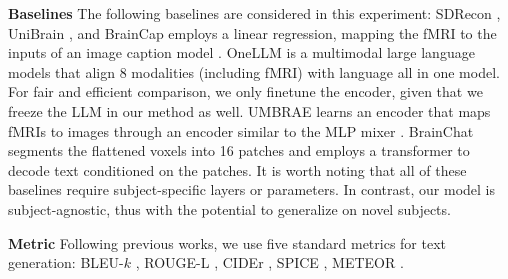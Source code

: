 \noindent\textbf{Baselines}
The following baselines are considered in this experiment: SDRecon \citep{takagi2023high}, UniBrain \citep{mai2023unibrain}, and BrainCap \citep{ferrante2023brain} employs a linear regression, mapping the fMRI to the inputs of an image caption model \citep{li2023blip}. OneLLM \citep{han2024onellm} is a multimodal large language models that align $8$ modalities (including fMRI) with language all in one model. For fair and efficient comparison, we only finetune the encoder, given that we freeze the LLM in our method as well. UMBRAE learns an encoder that maps fMRIs to images through an encoder similar to the MLP mixer \citep{tolstikhin2021mlp}. BrainChat \citep{huang2024brainchat} segments the flattened voxels into 16 patches and employs a transformer to decode text conditioned on the patches.
It is worth noting that all of these baselines require subject-specific layers or parameters. In contrast, our model is subject-agnostic, thus with the potential to generalize on novel subjects.

\noindent\textbf{Metric} Following previous works, we use five standard metrics for text generation: BLEU-$k$ \citep{papineni2002bleu}, ROUGE-L \citep{lin2004rouge}, CIDEr \citep{vedantam2015cider}, SPICE \citep{anderson2016spice}, METEOR \citep{banerjee2005meteor}.

